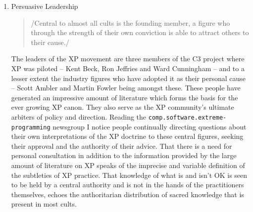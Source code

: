 \documentclass{article}
\begin{document}
\begin{enumerate}
Cults are a refuge for the uncertain. For those feeling lost or without
direction, the faux certainty of a cult provides welcome relief.
Software development is a field full of uncertainty. The increasing
societal reliance upon software and the attendant but conflicting
requirements for speedy and reliable development, has outpaced our
ability to learn better ways to do our work. Faced with this
unsatisfactory situation and desperate for a solution, the development
community is vulnerable to the claims and promises made by XP. The fact
that there is a community of enthusiastic proponents behind XP serves
only to enhance its credibility via the principle of \emph{social
proof} \footnote{\emph{Influence: The Psychology of Persuasion}, Robert Cialdini, Quill,
1993}. In truth, the presence of such a community only evidences
the widespread confusion about software development methods, coupled
with the hope that there is some answer that doesn't entail unpleasant
activities such as documentation.

\item Persuasive Leadership
\label{sec:orgheadline193}

\begin{quote}
/Central to almost all cults is the founding member, a figure who
through the strength of their own conviction is able to attract others
to their cause./
\end{quote}

The leaders of the XP movement are three members of the C3 project where
XP was piloted -- Kent Beck, Ron Jeffries and Ward Cunningham -- and to
a lesser extent the industry figures who have adopted it as their
personal cause -- Scott Ambler and Martin Fowler being amongst these.
These people have generated an impressive amount of literature which
forms the basis for the ever growing XP canon. They also serve as the XP
community's ultimate arbiters of policy and direction. Reading the
\texttt{comp.software.extreme-programming} newsgroup I notice people
continually directing questions about their own interpretations of the
XP doctrine to these central figures, seeking their approval and the
authority of their advice. That there is a need for personal
consultation in addition to the information provided by the large amount
of literature on XP speaks of the imprecise and variable definition of
the subtleties of XP practice. That knowledge of what is and isn't OK is
seen to be held by a central authority and is not in the hands of the
practitioners themselves, echoes the authoritarian distribution of
sacred knowledge that is present in most cults.


\end{enumerate}
\end{document}

